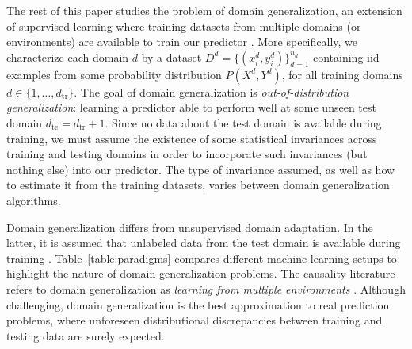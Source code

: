 \documentclass{article}
\newcommand{\dtr}{{d_\mathrm{tr}}}
\newcommand{\dte}{{d_\mathrm{te}}}
\begin{document}
The rest of this paper studies the problem of domain generalization, an extension of supervised learning where training datasets from multiple domains (or environments) are available to train our predictor \citep{blanchard2011generalizing}. 
More specifically, we characterize each domain $d$ by a dataset $D^d = \{(x_i^d, y_i^d)\}_{d=1}^{n_d}$ containing iid examples from some probability distribution $P(X^d, Y^d)$, for all training domains $d \in \{1, \ldots, \dtr\}$.
The goal of domain generalization is \emph{out-of-distribution generalization}: learning a predictor able to perform well at some unseen test domain $\dte = \dtr + 1$.
Since no data about the test domain is available during training, we must assume the existence of some statistical invariances across training and testing domains in order to incorporate such invariances (but nothing else) into our predictor.
The type of invariance assumed, as well as how to estimate it from the training datasets, varies between domain generalization algorithms.

Domain generalization differs from unsupervised domain adaptation. In the latter, it is assumed that unlabeled data from the test domain is available during training \citep{pan2009survey, patel2015visual, wilson2018survey}.
Table~\ref{table:paradigms} compares different machine learning setups to highlight the nature of domain generalization problems.
The causality literature refers to domain generalization as \emph{learning from multiple environments} \citep{peters2016causal, arjovsky2019invariant}.
Although challenging, domain generalization is the best approximation to real prediction problems, where unforeseen distributional discrepancies between training and testing data are surely expected.
\end{document}
